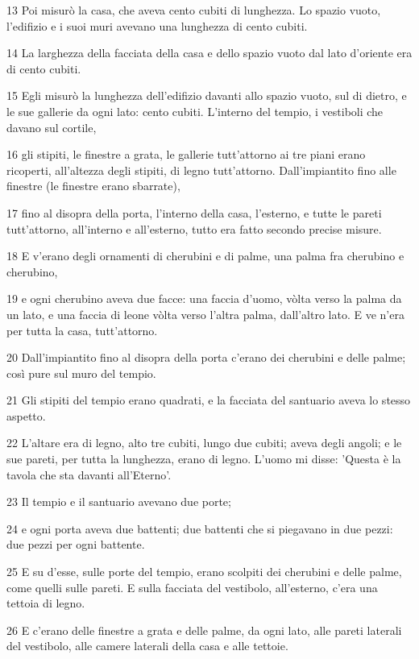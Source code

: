 \par 13 Poi misurò la casa, che aveva cento cubiti di lunghezza. Lo spazio vuoto, l'edifizio e i suoi muri avevano una lunghezza di cento cubiti.
\par 14 La larghezza della facciata della casa e dello spazio vuoto dal lato d'oriente era di cento cubiti.
\par 15 Egli misurò la lunghezza dell'edifizio davanti allo spazio vuoto, sul di dietro, e le sue gallerie da ogni lato: cento cubiti. L'interno del tempio, i vestiboli che davano sul cortile,
\par 16 gli stipiti, le finestre a grata, le gallerie tutt'attorno ai tre piani erano ricoperti, all'altezza degli stipiti, di legno tutt'attorno. Dall'impiantito fino alle finestre (le finestre erano sbarrate),
\par 17 fino al disopra della porta, l'interno della casa, l'esterno, e tutte le pareti tutt'attorno, all'interno e all'esterno, tutto era fatto secondo precise misure.
\par 18 E v'erano degli ornamenti di cherubini e di palme, una palma fra cherubino e cherubino,
\par 19 e ogni cherubino aveva due facce: una faccia d'uomo, vòlta verso la palma da un lato, e una faccia di leone vòlta verso l'altra palma, dall'altro lato. E ve n'era per tutta la casa, tutt'attorno.
\par 20 Dall'impiantito fino al disopra della porta c'erano dei cherubini e delle palme; così pure sul muro del tempio.
\par 21 Gli stipiti del tempio erano quadrati, e la facciata del santuario aveva lo stesso aspetto.
\par 22 L'altare era di legno, alto tre cubiti, lungo due cubiti; aveva degli angoli; e le sue pareti, per tutta la lunghezza, erano di legno. L'uomo mi disse: 'Questa è la tavola che sta davanti all'Eterno'.
\par 23 Il tempio e il santuario avevano due porte;
\par 24 e ogni porta aveva due battenti; due battenti che si piegavano in due pezzi: due pezzi per ogni battente.
\par 25 E su d'esse, sulle porte del tempio, erano scolpiti dei cherubini e delle palme, come quelli sulle pareti. E sulla facciata del vestibolo, all'esterno, c'era una tettoia di legno.
\par 26 E c'erano delle finestre a grata e delle palme, da ogni lato, alle pareti laterali del vestibolo, alle camere laterali della casa e alle tettoie.

